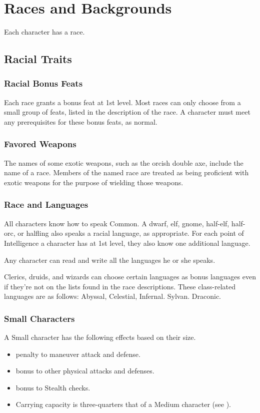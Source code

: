 \chapter{Races and Backgrounds}

Each character has a race.

\section{Racial Traits}

\subsection{Racial Bonus Feats}
Each race grants a bonus feat at 1st level. Most races can only choose from a small group of feats, listed in the description of the race. A character must meet any prerequisites for these bonus feats, as normal.

\subsection{Favored Weapons}
The names of some exotic weapons, such as the orcish double axe, include the name of a race. Members of the named race are treated as being proficient with exotic weapons for the purpose of wielding those weapons.

\subsection{Race and Languages}
All characters know how to speak Common. A dwarf, elf, gnome, half-elf, half-orc, or halfling also speaks a racial language, as appropriate. For each point of Intelligence a character has at 1st level, they also know one additional language.

 Any character can read and write all the languages he or she speaks.

 Clerics, druids, and wizards can choose certain languages as bonus languages even if they're not on the lists found in the race descriptions. These class-related languages are as follows:
 Abyssal, Celestial, Infernal.
 Sylvan.
 Draconic.

\subsection{Small Characters}\label{Small Characters}
A Small character has the following effects based on their size.
  \begin{itemize} 
    \item {} penalty to maneuver attack and defense.
    \item {} bonus to other physical attacks and defenses.
    \item {} bonus to Stealth checks.
    \item Carrying capacity is three-quarters that of a Medium character (see ).
  \end{itemize}

